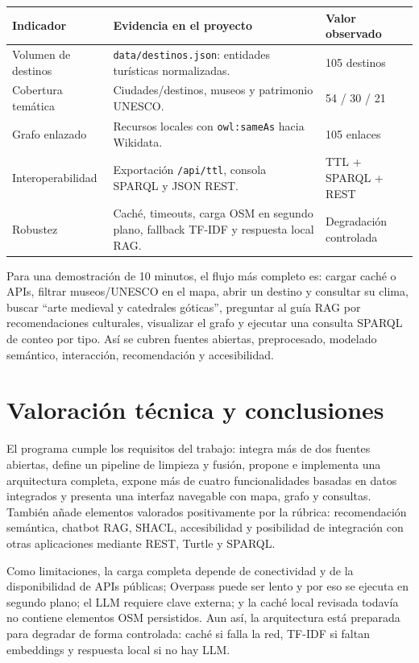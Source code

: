 \documentclass[10pt,a4paper]{article}
\begin{document}
\begin{table}[H]
\centering
\scriptsize
\begin{tabularx}{\textwidth}{p{3.2cm}X p{2.5cm}}
\toprule
\textbf{Indicador} & \textbf{Evidencia en el proyecto} & \textbf{Valor observado}\\
\midrule
Volumen de destinos & \texttt{data/destinos.json}: entidades turísticas normalizadas. & 105 destinos\\
Cobertura temática & Ciudades/destinos, museos y patrimonio UNESCO. & 54 / 30 / 21\\
Grafo enlazado & Recursos locales con \texttt{owl:sameAs} hacia Wikidata. & 105 enlaces\\
Interoperabilidad & Exportación \texttt{/api/ttl}, consola SPARQL y JSON REST. & TTL + SPARQL + REST\\
Robustez & Caché, timeouts, carga OSM en segundo plano, fallback TF-IDF y respuesta local RAG. & Degradación controlada\\
\bottomrule
\end{tabularx}
\end{table}

Para una demostración de 10 minutos, el flujo más completo es: cargar caché o APIs, filtrar museos/UNESCO en el mapa, abrir un destino y consultar su clima, buscar ``arte medieval y catedrales góticas'', preguntar al guía RAG por recomendaciones culturales, visualizar el grafo y ejecutar una consulta SPARQL de conteo por tipo. Así se cubren fuentes abiertas, preprocesado, modelado semántico, interacción, recomendación y accesibilidad.

\clearpage

\section{Valoración técnica y conclusiones}

El programa cumple los requisitos del trabajo: integra más de dos fuentes abiertas, define un pipeline de limpieza y fusión, propone e implementa una arquitectura completa, expone más de cuatro funcionalidades basadas en datos integrados y presenta una interfaz navegable con mapa, grafo y consultas. También añade elementos valorados positivamente por la rúbrica: recomendación semántica, chatbot RAG, SHACL, accesibilidad y posibilidad de integración con otras aplicaciones mediante REST, Turtle y SPARQL.

Como limitaciones, la carga completa depende de conectividad y de la disponibilidad de APIs públicas; Overpass puede ser lento y por eso se ejecuta en segundo plano; el LLM requiere clave externa; y la caché local revisada todavía no contiene elementos OSM persistidos. Aun así, la arquitectura está preparada para degradar de forma controlada: caché si falla la red, TF-IDF si faltan embeddings y respuesta local si no hay LLM.
\end{document}
